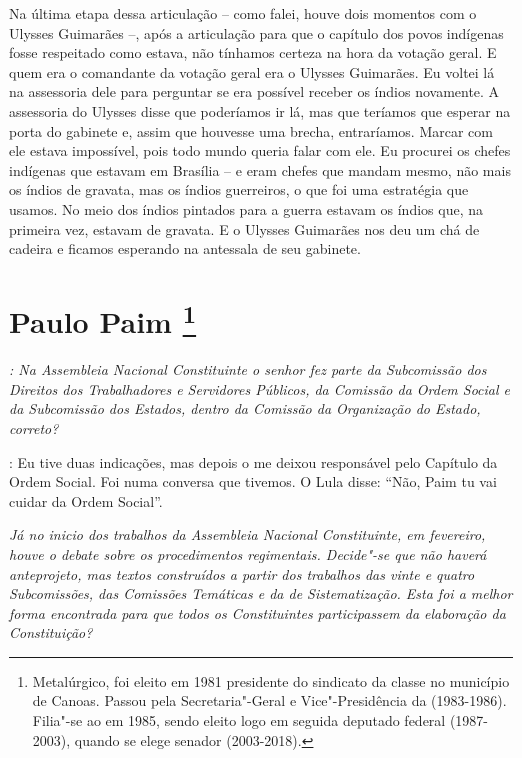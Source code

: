 Na última etapa dessa articulação -- como falei, houve
dois momentos com o Ulysses Guimarães --, após a articulação para que o
capítulo dos povos indígenas fosse respeitado como estava, não tínhamos
certeza na hora da votação geral. E quem era o comandante da votação
geral era o Ulysses Guimarães. Eu voltei lá na assessoria dele para
perguntar se era possível receber os índios novamente. A assessoria do
Ulysses disse que poderíamos ir lá, mas que teríamos que esperar na
porta do gabinete e, assim que houvesse uma brecha, entraríamos. Marcar
com ele estava impossível, pois todo mundo queria falar com ele. Eu
procurei os chefes indígenas que estavam em Brasília -- e eram chefes
que mandam mesmo, não mais os índios de gravata, mas os índios
guerreiros, o que foi uma estratégia que usamos. No meio dos índios
pintados para a guerra estavam os índios que, na primeira vez, estavam
de gravata. E o Ulysses Guimarães nos deu um chá de cadeira e ficamos
esperando na antessala de seu gabinete.

\chapter{Paulo Paim
\footnote{Metalúrgico, foi eleito em 1981 presidente do sindicato da classe no
município de Canoas. Passou pela Secretaria"-Geral e Vice"-Presidência da
 (1983-1986). Filia"-se ao  em 1985, sendo eleito logo em seguida
deputado federal (1987-2003), quando se elege senador (2003-2018).}}

\emph{: Na Assembleia Nacional Constituinte o senhor fez parte da
Subcomissão dos Direitos dos Trabalhadores e Servidores Públicos, da
Comissão da Ordem Social e da Subcomissão dos Estados, dentro da
Comissão da Organização do Estado, correto?}

: Eu tive duas indicações, mas depois o  me deixou
responsável pelo Capítulo da Ordem Social. Foi numa conversa que
tivemos. O Lula disse: ``Não, Paim tu vai cuidar da Ordem Social''.

\medskip

\noindent\emph{Já no inicio dos trabalhos da Assembleia Nacional Constituinte,
em fevereiro, houve o debate sobre os procedimentos regimentais.
Decide"-se que não haverá anteprojeto, mas textos construídos a partir
dos trabalhos das vinte e quatro Subcomissões, das Comissões Temáticas e
da de Sistematização. Esta foi a melhor forma encontrada para que todos
os Constituintes participassem da elaboração da Constituição?}

